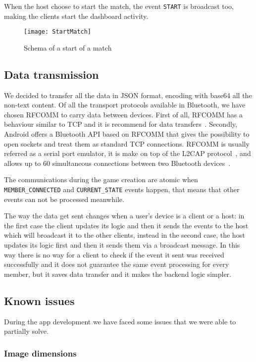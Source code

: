 When the host choose to start the match, the event \texttt{START} is 
broadcast too, making the clients start the dashboard activity.

\begin{figure}[t]
 \centering
 \texttt{[image: StartMatch]}
 \caption{Schema of a start of a match}
 \label{fig:gbStartMatch}
\end{figure}

\subsection{Data transmission}

We decided to transfer all the data in JSON format, encoding with base64 all the
non-text content.
Of all the transport protocols available in Bluetooth, we have chosen RFCOMM to 
carry data between devices. First of all, RFCOMM has a behaviour similar to TCP 
and it is recommend for data transfers~\cite{bisdikian01}. Secondly, Android 
offers a Bluetooth API based on RFCOMM that gives the possibility to open 
sockets and treat them as standard TCP connections.
RFCOMM is usually referred as a serial port emulator, it is make on top of 
the L2CAP protocol~\cite{bisdikian01}, and allows up to 60 simultaneous 
connections between two Bluetooth devices~\cite{aneesh12}.

The communications during the game creation are atomic when 
\texttt{MEMBER\_CONNECTED} and \texttt{CURRENT\_STATE} events happen, that 
means that other events can not be processed meanwhile.

The way the data get sent changes when a user's device is a client or a 
host: in the first case the client updates its logic and then it sends the 
events to the host which will broadcast it to the other clients, instead in the 
second case, the host updates its logic first and then it sends them via 
a broadcast message. In this way there is no way for a client to check if the 
event it sent was received successfully and it does not guarantee the same event 
processing for every member, but it saves data transfer and it makes the 
backend logic simpler.

\subsection{Known issues}

During the app development we have faced some issues that we were able to 
partially solve.

\subsubsection{Image dimensions}


